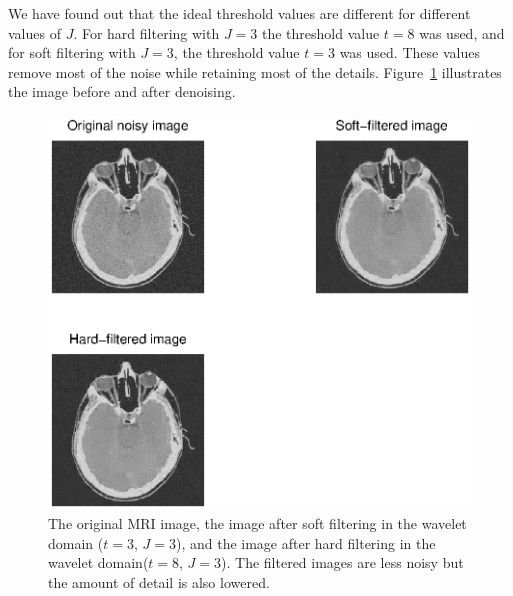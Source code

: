 We have found out that the ideal threshold values are different for different values of \(J\).
For hard filtering with \(J=3\) the threshold value \(t=8\) was used, and for soft filtering with \(J=3\), the threshold value \(t=3\) was used. 
These values remove most of the noise while retaining most of the details.
Figure~\ref{fig:noiseReductionTest} illustrates the image before and after denoising.

\begin{figure}[htb]
\centering
\includegraphics[width=\textwidth]{mri_filters.eps}
\caption{The original MRI image, the image after soft filtering in the wavelet domain (\(t=3\), \(J=3\)), and the image after hard filtering in the wavelet domain(\(t=8\), \(J=3\)). The filtered images are less noisy but the amount of detail is also lowered.}
\label{fig:noiseReductionTest}
\end{figure} 
\clearpage